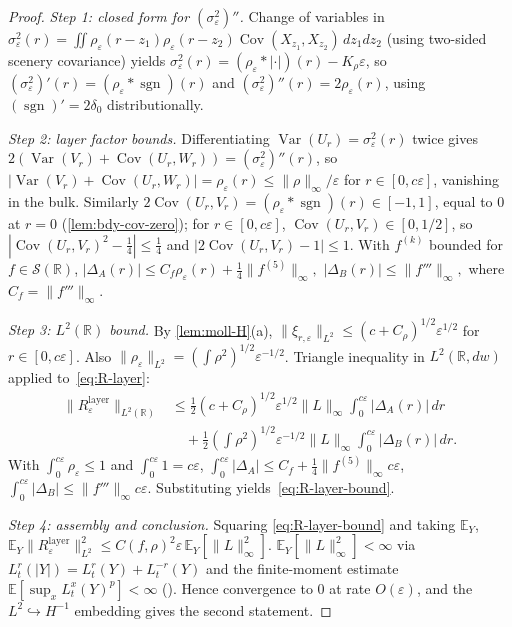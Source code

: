 \documentclass[EJP]{ejpecp}
\newcommand{\R}{\mathbb{R}}
\renewcommand{\E}{\mathbb{E}}
\DeclareMathOperator{\Var}{Var}
\DeclareMathOperator{\Cov}{Cov}
\DeclareMathOperator{\sgn}{sgn}
\begin{document}
\begin{proof}
\emph{Step 1: closed form for $(\sigma_{\varepsilon}^{2})''$.}
Change of variables in
$\sigma_{\varepsilon}^{2}(r)=\iint\rho_{\varepsilon}(r-z_{1})\rho_{\varepsilon}(r-z_{2})\Cov(X_{z_{1}},X_{z_{2}})\,dz_{1}dz_{2}$
(using two-sided scenery covariance) yields
$\sigma_{\varepsilon}^{2}(r)=(\rho_{\varepsilon}*|\cdot|)(r)-K_{\rho}\varepsilon$,
so $(\sigma_{\varepsilon}^{2})'(r)=(\rho_{\varepsilon}*\sgn)(r)$ and
$(\sigma_{\varepsilon}^{2})''(r)=2\rho_{\varepsilon}(r)$, using
$(\sgn)'=2\delta_0$ distributionally.

\emph{Step 2: layer factor bounds.}
Differentiating $\Var(U_r)=\sigma_\varepsilon^{2}(r)$ twice gives
$2(\Var(V_r)+\Cov(U_r,W_r))=(\sigma_\varepsilon^{2})''(r)$, so
$|\Var(V_r)+\Cov(U_r,W_r)|=\rho_\varepsilon(r)\le\|\rho\|_\infty/\varepsilon$
for $r\in[0,c\varepsilon]$, vanishing in the bulk. Similarly
$2\Cov(U_r,V_r)=(\rho_\varepsilon*\sgn)(r)\in[-1,1]$, equal to $0$
at $r=0$ (\cref{lem:bdy-cov-zero}); for $r\in[0,c\varepsilon]$,
$\Cov(U_r,V_r)\in[0,1/2]$, so
$|\Cov(U_r,V_r)^{2}-\tfrac14|\le\tfrac14$ and
$|2\Cov(U_r,V_r)-1|\le 1$. With $f^{(k)}$ bounded for
$f\in\mathscr S(\R)$,
\(
 |\Delta_A(r)|\le C_f\rho_\varepsilon(r)+\tfrac14\|f^{(5)}\|_\infty,
\)
\(
 |\Delta_B(r)|\le\|f'''\|_\infty,
\)
where $C_f=\|f'''\|_\infty$.

\emph{Step 3: $L^{2}(\R)$ bound.}
By \cref{lem:moll-H}(a), $\|\xi_{r,\varepsilon}\|_{L^{2}}\le(c+C_\rho)^{1/2}\varepsilon^{1/2}$
for $r\in[0,c\varepsilon]$. Also
$\|\rho_\varepsilon\|_{L^{2}}=(\int\rho^{2})^{1/2}\varepsilon^{-1/2}$.
Triangle inequality in $L^{2}(\R,dw)$ applied to~\eqref{eq:R-layer}:
\begin{align*}
 \|R_{\varepsilon}^{\mathrm{layer}}\|_{L^{2}(\R)}
 &\le\tfrac12(c+C_\rho)^{1/2}\varepsilon^{1/2}\|L\|_\infty\!\int_0^{c\varepsilon}|\Delta_A(r)|\,dr\\
 &\quad+\tfrac12(\textstyle\int\rho^{2})^{1/2}\varepsilon^{-1/2}\|L\|_\infty\!\int_0^{c\varepsilon}|\Delta_B(r)|\,dr.
\end{align*}
With $\int_0^{c\varepsilon}\rho_\varepsilon\le 1$ and
$\int_0^{c\varepsilon}1=c\varepsilon$,
$\int_0^{c\varepsilon}|\Delta_A|\le C_f+\tfrac14\|f^{(5)}\|_\infty c\varepsilon$,
$\int_0^{c\varepsilon}|\Delta_B|\le\|f'''\|_\infty c\varepsilon$.
Substituting yields~\eqref{eq:R-layer-bound}.

\emph{Step 4: assembly and conclusion.}
Squaring \eqref{eq:R-layer-bound} and taking $\E_Y$,
$\E_Y\|R_\varepsilon^{\mathrm{layer}}\|_{L^{2}}^{2}
\le C(f,\rho)^{2}\varepsilon\,\E_Y[\|L\|_\infty^{2}]$.
$\E_Y[\|L\|_\infty^{2}]<\infty$ via
$L_t^{r}(|Y|)=L_t^{r}(Y)+L_t^{-r}(Y)$ and the finite-moment estimate
$\E[\sup_x L_t^{x}(Y)^{p}]<\infty$ (\cite[Thm.\ 9.4.1]{MarcusRosen}).
Hence convergence to $0$ at rate $O(\varepsilon)$, and the
$L^{2}\hookrightarrow H^{-1}$ embedding gives the second statement.
\end{proof}
\end{document}
